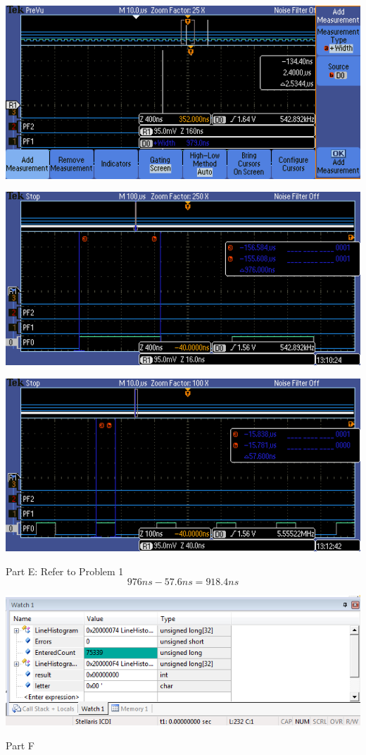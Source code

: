 \documentclass[11pt]{article}
\begin{document}
 \centerline{ \includegraphics[width=1\textwidth]{TEK00005}\\[.25in]}
  \centerline{\includegraphics[width=1\textwidth]{TEK00007}\\[.25in]}
 \centerline{ \includegraphics[width=1\textwidth]{TEK00008}\\[.25in]} 
  Part E: Refer to Problem 1
  \begin{equation*}
  976ns - 57.6ns = 918.4 ns
  \end{equation*}
  \centerline{\includegraphics[width=1\textwidth]{critSectionsRxFIFO}\\[.25in]}
  Part F\\
\end{document}
